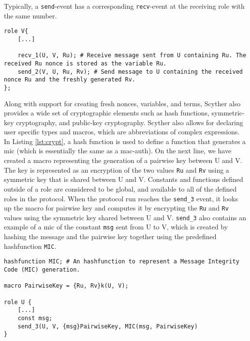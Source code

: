 Typically, a \texttt{send}-event has a corresponding \texttt{recv}-event at the receiving role with the same number.\newline


\begin{lstlisting}[caption={Events in Role V usually corresponds to events in role U.}]
role V{
	[...]
	
	recv_1(U, V, Ru); # Receive message sent from U containing Ru. The received Ru nonce is stored as the variable Ru. 
	send_2(V, U, Ru, Rv); # Send message to U containing the received nonce Ru and the freshly generated Rv. 
};
\end{lstlisting}


Along with support for creating fresh nonces, variables, and terms, Scyther also provides a wide set of cryptographic elements such as hash functions, symmetric-key cryptography, and public-key cryptography. Scyther also allows for declaring user specific types and macros, which are abbreviations of complex expressions. In Listing \ref{lst:crypt}, a hash function is used to define a function that generates a \gls{mic} (which is essentially the same as a \gls{mac-auth}). On the next line, we have created a macro representing the generation of a pairwise key between U and V. The key is represented as an encryption of the two values \texttt{Ru} and \texttt{Rv} using a symmetric key that is shared between U and V. Constants and functions defined outside of a role are considered to be global, and available to all of the defined roles in the protocol. When the protocol run reaches the \texttt{send\_3} event, it looks up the macro for pairwise key and computes it by encrypting the \texttt{Ru} and \texttt{Rv} values using the symmetric key shared between U and V. \texttt{send\_3} also contains an example of a \gls{mic} of the constant \texttt{msg} sent from U to V, which is created by hashing the message and the pairwise key together using the predefined hashfunction \texttt{MIC}.\newline


\begin{lstlisting}[caption={Example of how to use hashfunctions, macros and encryption.}, label={lst:crypt}]
hashfunction MIC; # An hashfunction to represent a Message Integrity Code (MIC) generation.

macro PairwiseKey = {Ru, Rv}k(U, V);

role U {
	[...]
	const msg;
	send_3(U, V, {msg}PairwiseKey, MIC(msg, PairwiseKey)
}
\end{lstlisting}


